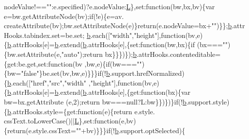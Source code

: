 \begin{DoxyCode}
      nodeValue!==\textcolor{stringliteral}{""}:e.specified)?e.nodeValue:\hyperlink{jquery_8js_a38ee4c0b5f4fe2a18d0c783af540d253}{L}\},\textcolor{keyword}{set}:\textcolor{keyword}{function}(bw,bx,bv)\{var e=bw.getAttributeNode(bv);\textcolor{keywordflow}{if}(!e)\{e=av.
      createAttribute(bv);bw.setAttributeNode(e)\}\textcolor{keywordflow}{return}(e.nodeValue=bx+\textcolor{stringliteral}{""})\}\};\hyperlink{jquery_8js_aa4026ad5544b958e54ce5e106fa1c805}{b}.attrHooks.tabindex.set=be.set;
      \hyperlink{jquery_8js_aa4026ad5544b958e54ce5e106fa1c805}{b}.each([\textcolor{stringliteral}{"width"},\textcolor{stringliteral}{"height"}],\textcolor{keyword}{function}(bv,e)\{\hyperlink{jquery_8js_aa4026ad5544b958e54ce5e106fa1c805}{b}.attrHooks[e]=\hyperlink{jquery_8js_aa4026ad5544b958e54ce5e106fa1c805}{b}.extend(\hyperlink{jquery_8js_aa4026ad5544b958e54ce5e106fa1c805}{b}.attrHooks[e],\{set:function(bw,bx)\{if
      (bx===\textcolor{stringliteral}{""})\{bw.setAttribute(e,\textcolor{stringliteral}{"auto"});return bx\}\}\})\});\hyperlink{jquery_8js_aa4026ad5544b958e54ce5e106fa1c805}{b}.attrHooks.contenteditable=\{\textcolor{keyword}{get}:be.get,\textcolor{keyword}{set}:\textcolor{keyword}{function}(bv
      ,bw,e)\{\textcolor{keywordflow}{if}(bw===\textcolor{stringliteral}{""})\{bw=\textcolor{stringliteral}{"false"}\}be.set(bv,bw,e)\}\}\}\textcolor{keywordflow}{if}(!\hyperlink{jquery_8js_aa4026ad5544b958e54ce5e106fa1c805}{b}.support.hrefNormalized)\{\hyperlink{jquery_8js_aa4026ad5544b958e54ce5e106fa1c805}{b}.each([\textcolor{stringliteral}{"href"},\textcolor{stringliteral}{"src"},\textcolor{stringliteral}{"width"}
      ,\textcolor{stringliteral}{"height"}],\textcolor{keyword}{function}(bv,e)\{\hyperlink{jquery_8js_aa4026ad5544b958e54ce5e106fa1c805}{b}.attrHooks[e]=\hyperlink{jquery_8js_aa4026ad5544b958e54ce5e106fa1c805}{b}.extend(\hyperlink{jquery_8js_aa4026ad5544b958e54ce5e106fa1c805}{b}.attrHooks[e],\{get:function(bx)\{var bw=bx.getAttribute
      (e,2);return bw===null?L:bw\}\})\})\}\textcolor{keywordflow}{if}(!\hyperlink{jquery_8js_aa4026ad5544b958e54ce5e106fa1c805}{b}.support.style)\{\hyperlink{jquery_8js_aa4026ad5544b958e54ce5e106fa1c805}{b}.attrHooks.style=\{\textcolor{keyword}{get}:\textcolor{keyword}{function}(e)\{\textcolor{keywordflow}{return} e.style.
      cssText.toLowerCase()||\hyperlink{jquery_8js_a38ee4c0b5f4fe2a18d0c783af540d253}{L}\},\textcolor{keyword}{set}:\textcolor{keyword}{function}(e,bv)\{\textcolor{keywordflow}{return}(e.style.cssText=\textcolor{stringliteral}{""}+bv)\}\}\}\textcolor{keywordflow}{if}(!\hyperlink{jquery_8js_aa4026ad5544b958e54ce5e106fa1c805}{b}.support.optSelected)\{

\end{DoxyCode}
